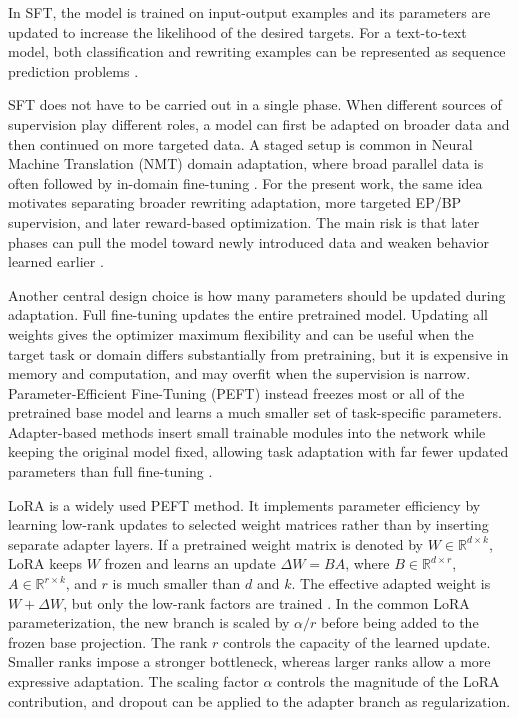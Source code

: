 In SFT, the model is trained on input-output examples
and its parameters are updated to increase the likelihood of the desired
targets. For a text-to-text model, both classification and
rewriting examples can be represented as sequence prediction problems
\citep{Raffel2019ExploringTL}.

SFT does not have to be carried out in a single phase. When different sources of
supervision play different roles, a model can first be adapted on broader data
and then continued on more targeted data. A staged setup is common in Neural
Machine Translation (NMT) domain adaptation, where broad parallel data is often
followed by in-domain fine-tuning
\citep{cao-etal-2021-continual, gu-etal-2022-continual}. For the present work,
the same idea motivates separating broader rewriting adaptation, more targeted
EP/BP supervision, and later reward-based optimization. The main risk is that
later phases can pull the model toward newly introduced data and weaken behavior
learned earlier \citep{gu-etal-2022-continual, gu-feng-2020-investigating}.

Another central design choice is how many parameters should be updated during
adaptation. Full fine-tuning updates the entire pretrained model. Updating all
weights gives the optimizer maximum flexibility and can be useful when the target task or domain
differs substantially from pretraining, but it is expensive in memory and
computation, and may overfit when the supervision is narrow. Parameter-Efficient
Fine-Tuning (PEFT) instead freezes most or all of the pretrained base model and
learns a much smaller set of task-specific parameters. Adapter-based methods
insert small trainable modules into the network while keeping the original
model fixed, allowing task adaptation with far fewer updated parameters than
full fine-tuning \citep{pmlr-v97-houlsby19a, pfeiffer-etal-2021-adapterfusion}.

LoRA is a widely used PEFT method. It implements
parameter efficiency by learning low-rank updates to selected weight matrices
rather than by inserting separate adapter layers. If a pretrained weight matrix
is denoted by \(W \in \mathbb{R}^{d \times k}\), LoRA keeps \(W\) frozen and
learns an update \(\Delta W = BA\), where \(B \in \mathbb{R}^{d \times r}\),
\(A \in \mathbb{R}^{r \times k}\), and \(r\) is much smaller than \(d\) and
\(k\). The effective adapted weight is \(W + \Delta W\), but only the
low-rank factors are trained \citep{hu2022lora}. In the common LoRA
parameterization, the new branch is scaled by \(\alpha / r\) before being added
to the frozen base projection. The rank \(r\) controls the capacity of the
learned update. Smaller ranks impose a stronger bottleneck, whereas larger
ranks allow a more expressive adaptation. The scaling factor \(\alpha\)
controls the magnitude of the LoRA contribution, and dropout can be applied to
the adapter branch as regularization.

